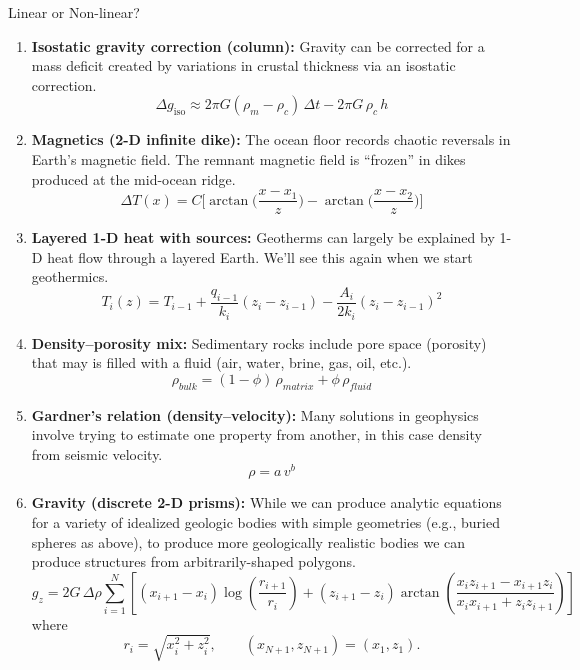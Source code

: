 \begin{activity}{Linear or Non-linear?}
\begin{enumerate}[label=Q\arabic*.,itemsep=6pt]
  \item \textbf{Isostatic gravity correction (column):} 
  Gravity can be corrected for a mass deficit created by variations in crustal thickness via an isostatic correction.
  \[
    \Delta g_{\mathrm{iso}} \approx 2\pi G(\rho_m-\rho_c)\,\Delta t - 2\pi G\,\rho_c\,h
  \]
  \answerbox[2cm]

  \item \textbf{Magnetics (2-D infinite dike):}
  The ocean floor records chaotic reversals in Earth's magnetic field.  The remnant magnetic field is ``frozen'' in dikes produced at the mid-ocean ridge.
  \[
    \Delta T(x) = C\Big[\arctan\Big(\frac{x-x_1}{z}\Big) - \arctan\Big(\frac{x-x_2}{z}\Big)\Big]
  \]
  \answerbox[2cm]

  \item \textbf{Layered 1-D heat with sources:}
  Geotherms can largely be explained by 1-D heat flow through a layered Earth.  We'll see this again when we start geothermics.
  \[
    T_i(z) = T_{i-1} + \frac{q_{i-1}}{k_i}(z_i - z_{i-1}) - \frac{A_i}{2k_i}(z_i - z_{i-1})^2
  \]
  \answerbox[2cm]

  \item \textbf{Density--porosity mix:}
  Sedimentary rocks include pore space (porosity) that may is filled with a fluid (air, water, brine, gas, oil, etc.).
  \[
    \rho_\mathit{bulk} = (1-\phi)\,\rho_\mathit{matrix} + \phi\,\rho_\mathit{fluid}
  \]
  \answerbox[2cm]

  \clearpage
  \item \textbf{Gardner's relation (density--velocity):}
  Many solutions in geophysics involve trying to estimate one property from another, in this case density from seismic velocity.
  \[
    \rho = a\,v^b
  \]
  \answerbox[2cm]

  \item \textbf{Gravity (discrete 2-D prisms):}
  While we can produce analytic equations for a variety of idealized geologic bodies with simple geometries (e.g., buried spheres as above), to produce more geologically realistic bodies we can produce structures from arbitrarily-shaped polygons.
  \[
    g_z =
    2G\,\Delta\rho
    \sum_{i=1}^{N}
    \left[
    (x_{i+1}-x_i)\log\!\left(\frac{r_{i+1}}{r_i}\right)
    +
    (z_{i+1}-z_i)
    \arctan\!\left(
    \frac{x_i z_{i+1} - x_{i+1} z_i}
    {x_i x_{i+1} + z_i z_{i+1}}
    \right)
    \right]
  \] 
  where
  \[
    r_i = \sqrt{x_i^2 + z_i^2}, 
    \qquad
    (x_{N+1}, z_{N+1}) = (x_1, z_1).
  \]
  \answerbox[2cm]
\end{enumerate}


\end{activity}
